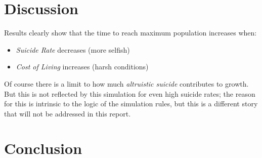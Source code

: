 \documentclass[a4paper,12pt,twocolumn]{article}
\begin{document}
\section{Discussion}
\begin{flushleft}
Results clearly show that the time to reach maximum population increases when:
\end{flushleft}
\begin{itemize}
\item \textit{Suicide Rate} decreases (more selfish)
\item \textit{Cost of Living} increases (harsh conditions)
\end{itemize}
\begin{flushleft}
Of course there is a limit to how much \textit{altruistic suicide} contributes to growth. But this is not reflected by this simulation for even high suicide rates; the reason for this is intrinsic to the logic of the simulation rules, but this is a different story that will not be addressed in this report.
\end{flushleft}

\begin{flushleft}

\end{flushleft}

\begin{flushleft}

\end{flushleft}

\begin{flushleft}

\end{flushleft}


\section{Conclusion}
\begin{flushleft}

\end{flushleft}


\raggedright


\end{document}
